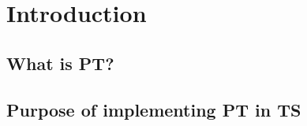 
\chapter{Introduction}\label{ch:introduction}

\section{What is PT?}

\section{Purpose of implementing PT in TS}


